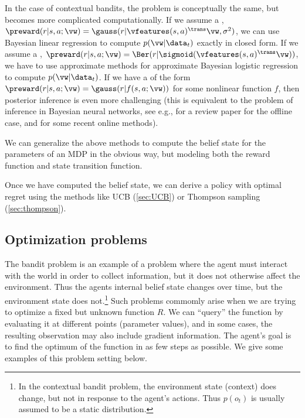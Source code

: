 In the case of contextual bandits, the problem is conceptually
the same, but becomes more
complicated computationally.
If we assume a ,
$\preward(r|s,a;\vw) = \gauss(r|\vfeatures(s,a)^\trans \vw,\sigma^2)$,
we can use Bayesian linear regression to compute
$p(\vw|\data_t)$ exactly in closed form.
If we assume a ,
$\preward(r|s,a;\vw) = \Ber(r|\sigmoid(\vfeatures(s,a)^\trans \vw))$,
we have to use approximate methods for approximate Bayesian logistic regression to compute
$p(\vw|\data_t)$.
If we have a 
of the form
$\preward(r|s,a;\vw) = \gauss(r|f(s,a; \vw))$
for some nonlinear function $f$,
then  posterior inference is even more challenging
(this is equivalent to the problem of inference
in Bayesian neural networks, see e.g., \citep{Arbel2023} for a review paper
for the offline case, and \citep{Duran-Martin2022,bong} for some recent online methods).

We can generalize the above methods to compute the belief state
for  the parameters of an MDP in the obvious way,
but modeling both the reward function and state transition function.


Once we have computed the belief state,
we can derive a policy with optimal  regret using the
methods  like UCB (\cref{sec:UCB})
or Thompson sampling (\cref{sec:thompson}).



\subsection{Optimization problems}
\label{sec:opt}

The  bandit problem is an example of a problem where the agent
must interact with the world in order to collect information,
but it does not otherwise affect the environment.
Thus the agents internal belief state changes over time,
but the environment state does not.\footnote{
%
In the contextual bandit problem, the environment state (context) does change,
but not in response to the agent's actions.
Thus $p(o_t)$ is usually assumed  to be a static distribution.
}
Such problems commomly arise when we are trying to optimize a fixed but unknown
function $R$. We can ``query'' the function by evaluating it at different
points (parameter values), and in some cases, the resulting observation
may also include gradient information.
The agent's goal is to find the optimum of the function in as few steps
as possible. We give some examples of this problem setting below.

